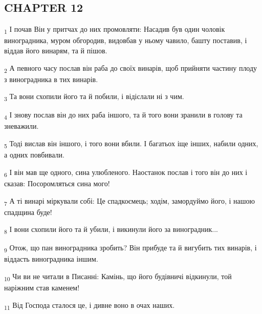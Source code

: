 \subsection{CHAPTER 12}
\begin{tcolorbox}
\textsubscript{1} І почав Він у притчах до них промовляти: Насадив був один чоловік виноградника, муром обгородив, видовбав у ньому чавило, башту поставив, і віддав його винарям, та й пішов.
\end{tcolorbox}
\begin{tcolorbox}
\textsubscript{2} А певного часу послав він раба до своїх винарів, щоб прийняти частину плоду з виноградника в тих винарів.
\end{tcolorbox}
\begin{tcolorbox}
\textsubscript{3} Та вони схопили його та й побили, і відіслали ні з чим.
\end{tcolorbox}
\begin{tcolorbox}
\textsubscript{4} І знову послав він до них раба іншого, та й того вони зранили в голову та зневажили.
\end{tcolorbox}
\begin{tcolorbox}
\textsubscript{5} Тоді вислав він іншого, і того вони вбили. І багатьох іще інших, набили одних, а одних повбивали.
\end{tcolorbox}
\begin{tcolorbox}
\textsubscript{6} І він мав ще одного, сина улюбленого. Наостанок послав і того він до них і сказав: Посоромляться сина мого!
\end{tcolorbox}
\begin{tcolorbox}
\textsubscript{7} А ті винарі міркували собі: Це спадкоємець; ходім, замордуймо його, і нашою спадщина буде!
\end{tcolorbox}
\begin{tcolorbox}
\textsubscript{8} І вони схопили його та й убили, і викинули його за виноградник...
\end{tcolorbox}
\begin{tcolorbox}
\textsubscript{9} Отож, що пан виноградника зробить? Він прибуде та й вигубить тих винарів, і віддасть виноградника іншим.
\end{tcolorbox}
\begin{tcolorbox}
\textsubscript{10} Чи ви не читали в Писанні: Камінь, що його будівничі відкинули, той наріжним став каменем!
\end{tcolorbox}
\begin{tcolorbox}
\textsubscript{11} Від Господа сталося це, і дивне воно в очах наших.
\end{tcolorbox}

